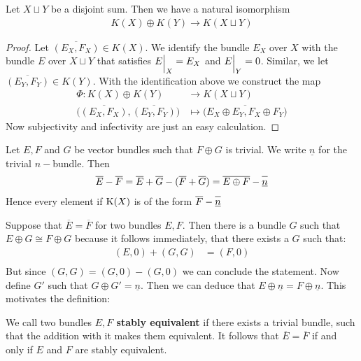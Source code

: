 \begin{theorem}[Additivity]
	Let $X\sqcup Y$ be a disjoint sum. Then we have a natural isomorphism
	\begin{align*}
		K(X)\oplus K(Y)\to K(X\sqcup Y)
	\end{align*}
\end{theorem}
\begin{proof}
	Let $\overline{(E_X,F_X)}\in K(X)$. We identify the bundle $E_X$ over $X$ with the bundle $E$ over $X\sqcup Y$ that satisfies ${E}\einsch{X}=E_X$ and ${E}\einsch{Y}=0$. Similar, we let $\overline{(E_Y,F_Y)}\in K(Y)$. With the identification above we construct the map 
	\begin{align*}
		\Phi: K(X)\oplus K(Y) &\to K(X\sqcup Y)\\
		\big(\overline{(E_X,F_X)},\overline{(E_Y,F_Y)} \big)& \mapsto \overline{\big(E_X\oplus E_Y,F_X\oplus F_Y \big)}
	\end{align*}
	Now subjectivity and infectivity are just an easy calculation.
\end{proof}
\begin{remark}
	Let $E,F$ and $G$ be vector bundles such that $F\oplus G$ is trivial. We write $\underline{n}$ for the trivial $n-$bundle. Then 
	\begin{align*}
		\overline{E}-\overline{F}=\overline{E}+\overline{G}-(\overline{F}+\overline{G})=\overline{E\oplus F}-\overline{\underline{n}\vphantom{E}}
	\end{align*} Hence every element if $\operatorname{\mathrm{K}}(X)$ is of the form $\overline{F}-\overline{\underline{n}\vphantom{E}}$
\end{remark}
\begin{remark}\label{rem: Elements in the K-Group are of the form F-n}
	Suppose that $\overline{E}=\overline{F}$ for two bundles $E,F$. Then there is a bundle $G$ such that $E\oplus G\cong F\oplus G$ because it follows immediately, that there exists a $G$ such that:
	\begin{align*}
		(E,0)+(G,G)&=(F,0)\\
	\end{align*}
	But since $(G,G)=(G,0)-(G,0)$ we can conclude the statement. Now define $G'$ such that $G\oplus G'=\underline{n}$. Then we can deduce that $E\oplus \underline{n}=F\oplus \underline{n}$. This motivates the definition:
\end{remark}
\begin{definition} \label{def: Stably Equivalent Bundles}
	We call two bundles \textbf{$E,F$ stably equivalent} if there exists a trivial bundle, such that the addition with it makes them equivalent. It follows that $\overline{E}=\overline{F}$ if and only if $E$ and $F$ are stably equivalent.
\end{definition}
